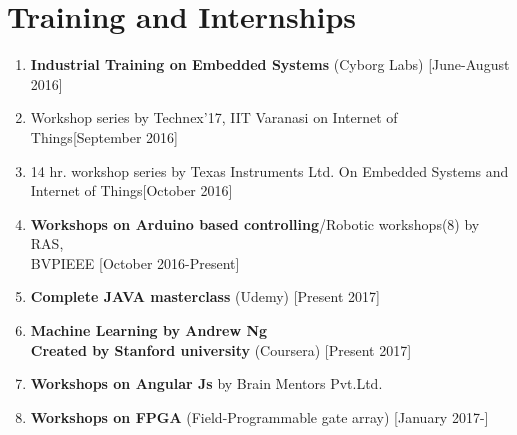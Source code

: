 \documentclass[11pt]{article}
\begin{document}
\begin{minipage}{1.0\linewidth}
\section{\color{magenta}Tra\color{black}ining and Internships}
\begin{enumerate}
\item \textbf{Industrial Training on Embedded Systems} (Cyborg Labs) [June-August 2016]
\item {Workshop series by Technex'17, IIT Varanasi on Internet of Things}[September 2016]
\item 14 hr. workshop series by Texas Instruments Ltd. On Embedded Systems and\\ Internet of Things[October 2016]
\item \textbf{Workshops on Arduino based controlling}/Robotic workshops(8) by RAS,\\ BVPIEEE [October 2016-Present]
\item \textbf{Complete JAVA masterclass} (Udemy) [Present 2017]
\item \textbf{Machine Learning by Andrew Ng\\ Created by Stanford university} (Coursera) [Present 2017]
\item \textbf{Workshops on Angular Js} by Brain Mentors Pvt.Ltd.
\item \textbf{Workshops on FPGA} (Field-Programmable gate array) [January 2017-]

\end{enumerate}
\end{minipage}
\end{document}
